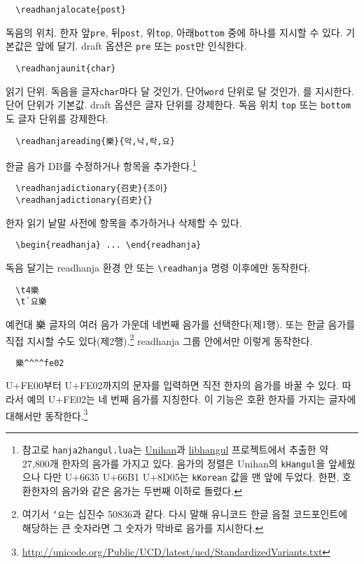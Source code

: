 \documentclass[a4paper,12pt]{article}
\begin{document}
\begin{verbatim}
  \readhanjalocate{post}
\end{verbatim}
독음의 위치. 한자 앞\verb|pre|, 뒤\verb|post|,
위\verb|top|, 아래\verb|bottom| 중에 하나를 지시할 수 있다.
기본값은 앞에 달기.
draft 옵션은 \verb|pre| 또는 \verb|post|만 인식한다.

\begin{verbatim}
  \readhanjaunit{char}
\end{verbatim}
읽기 단위. 독음을 글자\verb|char|마다 달 것인가, 단어\verb|word| 단위로
달 것인가, 를 지시한다. 단어 단위가 기본값.
draft 옵션은 글자 단위를 강제한다.
독음 위치 \verb|top| 또는 \verb|bottom|도 글자 단위를 강제한다.

\begin{verbatim}
  \readhanjareading{樂}{악,낙,락,요}
\end{verbatim}
한글 음가 DB를 수정하거나 항목을 추가한다.\footnote{참고로
  \texttt{hanja2hangul.lua}는
  \href{http://unicode.org/charts/unihan.html}{Unihan}과
  \href{https://github.com/choehwanjin/libhangul}{libhangul}
  프로젝트에서 추출한 약 27,800개 한자의 음가를
  가지고 있다. 음가의 정렬은 Unihan의 \texttt{kHangul}을 앞세웠으나
  다만 \mbox{U+6635} \mbox{U+66B1} \mbox{U+8D05}는 \texttt{kKorean} 값을
  맨 앞에 두었다. 한편, 호환한자의 음가와 같은 음가는 두번째 이하로 돌렸다.}

\begin{verbatim}
  \readhanjadictionary{召史}{조이}
  \readhanjadictionary{召史}{}
\end{verbatim}
한자 읽기 낱말 사전에 항목을 추가하거나 삭제할 수 있다.

\begin{verbatim}
  \begin{readhanja} ... \end{readhanja}
\end{verbatim}
독음 달기는 readhanja 환경 안 또는 \verb|\readhanja| 명령 이후에만 동작한다.

\begin{verbatim}
  \t4樂
  \t`요樂
\end{verbatim}
예컨대 樂 글자의 여러 음가 가운데 네번째 음가를 선택한다(제1행).
또는 한글 음가를 직접 지시할 수도 있다(제2행).\footnote{여기서 \texttt{`요}는 십진수 50836과 같다.
  다시 말해 유니코드 한글 음절 코드포인트에 해당하는 큰 숫자라면 그 숫자가 막바로 음가를 지시한다.}
readhanja 그룹 안에서만 이렇게 동작한다.

\begin{verbatim}
  樂^^^^fe02
\end{verbatim}
\mbox{U+FE00}부터 \mbox{U+FE02}까지의 문자를 입력하면 직전 한자의 음가를
바꿀 수 있다. 따라서 예의 \mbox{U+FE02}는 네 번째 음가를 지칭한다.
이 기능은 호환 한자를 가지는 글자에 대해서만 동작한다.\footnote{
\url{http://unicode.org/Public/UCD/latest/ucd/StandardizedVariants.txt}}
\end{document}
